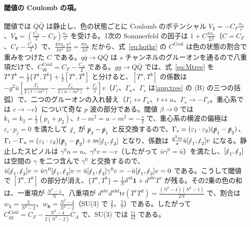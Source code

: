 \documentclass[a4paper,10pt]{ltjsarticle}
\newcommand{\tr}{\mathrm{tr}}
\begin{document}
\paragraph{閾値の Coulomb の項。}閾値では $Q\bar Q$ は静止し、色の状態ごとに Coulomb のポテンシャル $V_{\mathbf 1}=-C_F\frac{\alpha_s}r$、$V_{\mathbf 8}=(\frac{C_A}2-C_F)\frac{\alpha_s}r$ を受ける。1次の Sommerfeld の因子は $1+C\frac{\pi\alpha_s}{2\beta}$（$C=C_F$、$C_F-\frac{C_A}2$）で、$\frac{4\pi\alpha_s}{4\pi^2}\frac{\pi^2}{2\beta}=\frac{\pi\alpha_s}{2\beta}$ だから、式~\eqref{eq:hqthr} の $C^{\mathrm{Coul}}$ は色の状態の割合で重みをつけた $C$ である。$q\bar q\to Q\bar Q$ は $s$ チャンネルのグルーオンを通るので八重項だけで、$C^{\mathrm{Coul}}_{q\bar q}=C_F-\frac{C_A}2$ である。$gg\to Q\bar Q$ では、式~\eqref{eq:Mtree} を $T^aT^b=\frac12\{T^a,T^b\}+\frac12[T^a,T^b]$ と分けると、$[T^a,T^b]$ の係数は $-g^2\bar u[\frac{\Gamma_t}{2(t-m^2)}-\frac{\Gamma_u}{2(u-m^2)}+\frac{\Gamma_s}s]v$（$\Gamma_t$、$\Gamma_u$、$\Gamma_s$ は\ref{app:tree} の (B) の三つの括弧）で、二つのグルーオンの入れ替え（$\Gamma_t\leftrightarrow\Gamma_u$、$t\leftrightarrow u$、$\Gamma_s\to-\Gamma_s$。重心系では $c\to-c$）について奇な $p$ 波の部分である。閾値 $\beta\to0$ では $k_1=k_2=\frac12(p_1+p_2)$、$t-m^2=u-m^2=-\frac s2$ で、重心系の横波の偏極は $\varepsilon_i\cdot p_j=0$ を満たして $\slashed\varepsilon_i$ が $\slashed p_2-\slashed p_1$ と反交換するので、$\Gamma_s=(\varepsilon_1\cdot\varepsilon_2)(\slashed p_1-\slashed p_2)$、$\Gamma_t-\Gamma_u=(\varepsilon_1\cdot\varepsilon_2)(\slashed p_1-\slashed p_2)+m[\slashed\varepsilon_1,\slashed\varepsilon_2]$ となり、係数は $\frac{g^2m}s\bar u[\slashed\varepsilon_1,\slashed\varepsilon_2]v$ になる。静止したスピノルは $\gamma^0u=u$、$\gamma^0v=-v$（したがって $\bar u\gamma^0=\bar u$）を満たし、$[\slashed\varepsilon_1,\slashed\varepsilon_2]$ は空間の $\gamma$ を二つ含んで $\gamma^0$ と交換するので、$\bar u[\slashed\varepsilon_1,\slashed\varepsilon_2]v=\bar u\gamma^0[\slashed\varepsilon_1,\slashed\varepsilon_2]v=\bar u[\slashed\varepsilon_1,\slashed\varepsilon_2]\gamma^0v=-\bar u[\slashed\varepsilon_1,\slashed\varepsilon_2]v=0$ である。こうして閾値で $[T^a,T^b]$ の部分が消え、$\{T^a,T^b\}=\frac1N\delta^{ab}\mathbf 1+d^{abc}T^c$ が残る。その2乗の色の和は、一重項が $\frac{N^2-1}N$、八重項が $d^{abc}d^{abd}\tr(T^cT^d)=\frac{(N^2-4)(N^2-1)}{2N}$ で、割合は $w_{\mathbf 1}=\frac2{N^2-2}$、$w_{\mathbf 8}=\frac{N^2-4}{N^2-2}$（SU(3) で $\frac27$、$\frac57$）である。したがって $C^{\mathrm{Coul}}_{gg}=C_F-\frac{N^2-4}{2(N^2-2)}C_A$ で、SU(3) では $\frac{11}{42}$ である。
\end{document}
